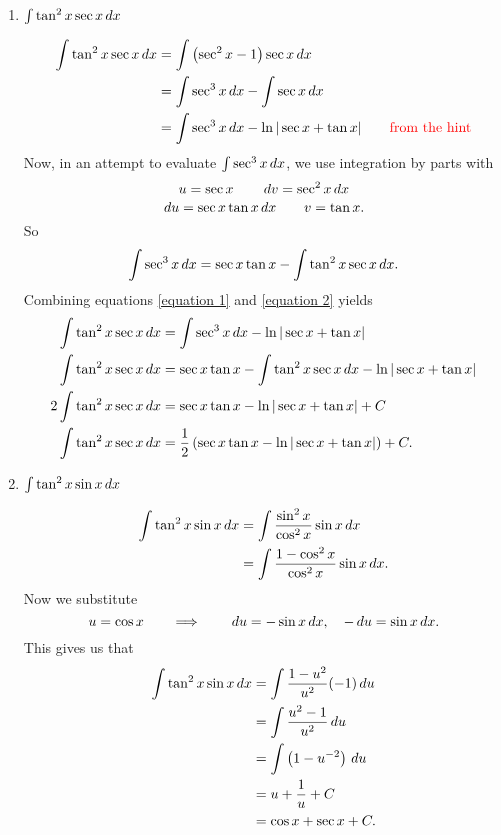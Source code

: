 \documentclass[noinstructornotes]{ximera}
\begin{document}
\begin{problem}
\begin{enumerate}
	
	
	\item  $\int \tan^2 x \sec x \,d x$ 
	\begin{freeResponse}
		\begin{align}
		\int \tan^2 x \sec x \,d x
		&= \int \left( \sec^2 x - 1 \right) \sec x \,d x  \nonumber	\\
		&= \int \sec^3 x \,d x - \int \sec x \,d x  		\nonumber	\\
		&= \int \sec^3 x \,d x - \ln | \sec x + \tan x| 	\qquad	{\color{red}\text{from the hint}}	\label{equation 1}
		\end{align}
	Now, in an attempt to evaluate $\int \sec^3 x \,d x$, we use integration by parts with
		{\color{red}
		\[
		u = \sec x 				\qquad	\,d v = \sec^2 x \,d x
		\]
		\[
		\,d u = \sec x \tan x \,d x	\qquad	v = \tan x.
		\]
		}
	So
		\begin{equation}\label{equation 2}
		\int \sec^3 x \,d x = \sec x \tan x - \int \tan^2 x \sec x \,d x.
		\end{equation}
	Combining equations \eqref{equation 1} and \eqref{equation 2} yields
		\begin{align*}
		\int \tan^2 x \sec x \,d x &= \int \sec^3 x \,d x - \ln | \sec x + \tan x|   \\
		\int \tan^2 x \sec x \,d x &= \sec x \tan x - \int \tan^2 x \sec x \,d x - \ln | \sec x + \tan x |  \\
		2 \int \tan^2 x \sec x \,d x &= \sec x \tan x - \ln | \sec x + \tan x | + C  \\
		\int \tan^2 x \sec x \,d x &= \frac{1}{2} \left( \sec x \tan x - \ln | \sec x + \tan x | \right) + C.
		\end{align*}
	\end{freeResponse}
	
	
	
	\item  $\int \tan^2 x \sin x \,d x$
	\begin{freeResponse}
		\begin{align*}
		\int \tan^2 x \sin x \,d x
		&= \int \frac{\sin^2 x}{\cos^2 x} \sin x \,d x  \\
		&= \int \frac{1-\cos^2 x}{\cos^2 x} \sin x \,d x.
		\end{align*}
	Now we substitute
		{\color{red}
		\[
		u = \cos x 		\qquad	\Longrightarrow		\qquad	\,d u = - \sin x \,d x, \quad - \,d u = \sin x \,d x.
		\]
		}
	This gives us that
		\begin{align*}
		\int \tan^2 x \sin x \,d x
		&= \int \frac{1-u^2}{u^2} (-1) \,d u  \\
		&= \int \frac{u^2 - 1}{u^2} \,d u  \\
		&= \int \left( 1 - u^{-2} \right) \,d u  \\
		&= u + \frac{1}{u} + C  \\
		&= \cos x + \sec x + C.
		\end{align*}
	\end{freeResponse}
	
	\end{enumerate}
	
\end{problem}
\end{document}
